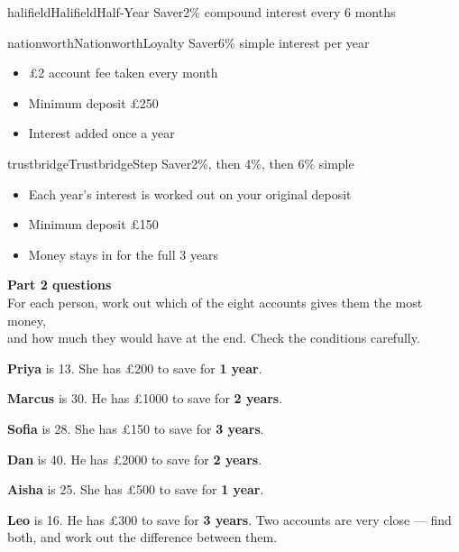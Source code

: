 \documentclass[12pt]{article}
\newcommand{\deal}[1]{%
  \begin{itemize}[leftmargin=4mm,itemsep=1.6mm,topsep=0mm,parsep=0mm,label=\textbullet]
  #1
  \end{itemize}}
\begin{document}
\begin{tcbraster}[raster columns=2, raster equal height=rows,
                  raster column skip=5mm, raster row skip=5mm]
\begin{advert}{halifield}{Halifield}{Half-Year Saver}{2\% compound interest every 6 months}
{}
\end{advert}
\begin{advert}{nationworth}{Nationworth}{Loyalty Saver}{6\% simple interest per year}
\deal{
  \item \pounds2 account fee taken every month
  \item Minimum deposit \pounds250
  \item Interest added once a year
}
\end{advert}
\begin{advert}{trustbridge}{Trustbridge}{Step Saver}{2\%, then 4\%, then 6\% simple}
\deal{
  \item Each year's interest is worked out on your original deposit
  \item Minimum deposit \pounds150
  \item Money stays in for the full 3 years
}
\end{advert}
\end{tcbraster}

\newpage
\begin{center}
  {\LARGE\bfseries Part 2 questions}\\[1.5mm]
  {\small For each person, work out which of the eight accounts gives them the most money,\\
  and how much they would have at the end. Check the conditions carefully.}
\end{center}
\vspace{2mm}

\begin{qlist}
  \item \textbf{Priya} is 13. She has \pounds200 to save for \textbf{1 year}.
  \item \textbf{Marcus} is 30. He has \pounds1000 to save for \textbf{2 years}.
  \item \textbf{Sofia} is 28. She has \pounds150 to save for \textbf{3 years}.
  \item \textbf{Dan} is 40. He has \pounds2000 to save for \textbf{2 years}.
  \item \textbf{Aisha} is 25. She has \pounds500 to save for \textbf{1 year}.
  \item \textbf{Leo} is 16. He has \pounds300 to save for \textbf{3 years}. Two accounts are very close --- find both, and work out the difference between them.
\end{qlist}
\end{document}
